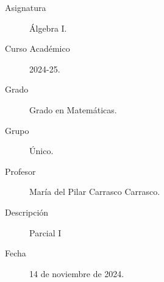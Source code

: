 \documentclass[12pt]{article}
\begin{document}

    
    

    \begin{description}
        \item[Asignatura] Álgebra I.
        \item[Curso Académico] 2024-25.
        \item[Grado] Grado en Matemáticas.
        \item[Grupo] Único.
        \item[Profesor] María del Pilar Carrasco Carrasco.
        \item[Descripción] Parcial I
        \item[Fecha] 14 de noviembre de 2024.
    \end{description}
    \newpage
\end{document}
